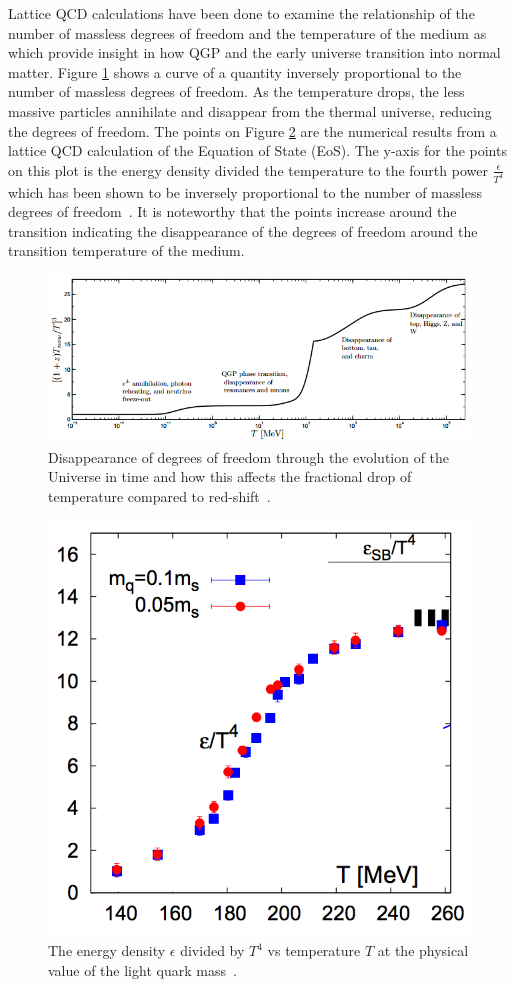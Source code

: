 Lattice QCD calculations have been done to examine the relationship of the number of massless degrees of freedom and the temperature of the medium as which provide insight in how QGP and the early universe transition into normal matter. Figure \ref{fig:lattice_degrees} shows a curve of a quantity inversely proportional to the number of massless degrees of freedom. As the temperature drops, the less massive particles annihilate and disappear from the thermal universe, reducing the degrees of freedom. The points on Figure \ref{fig:lattice_degrees_calc} are the numerical results from a lattice QCD calculation of the Equation of State (EoS). The y-axis for the points on this plot is the energy density divided the temperature to the fourth power $\frac{\epsilon}{T^4}$ which has been shown to be inversely proportional to the number of massless degrees of freedom~\cite{PhysRevD.81.054504}. It is noteworthy that the points increase around the transition indicating the disappearance of the degrees of freedom around the transition temperature of the medium.

\begin{figure}[!ht]
\begin{center}
\includegraphics[width=0.55\linewidth]{figs/lattice_degrees_plot.png}
\caption{Disappearance of degrees of freedom through the evolution of the Universe in time
and how this affects the fractional drop of temperature compared to red-shift~\cite{1742-6596-509-1-012014}.}
\end{center}
\label{fig:lattice_degrees}
\end{figure}

\begin{figure}[!ht]
\begin{center}
\includegraphics[width=0.55\linewidth]{figs/lattice_degrees_calculation.png}
\caption{The energy density $\epsilon$ divided by $T^4$ vs temperature $T$ at the physical value of the light quark mass~\cite{PhysRevD.81.054504}.}
\end{center}
\label{fig:lattice_degrees_calc}
\end{figure}


